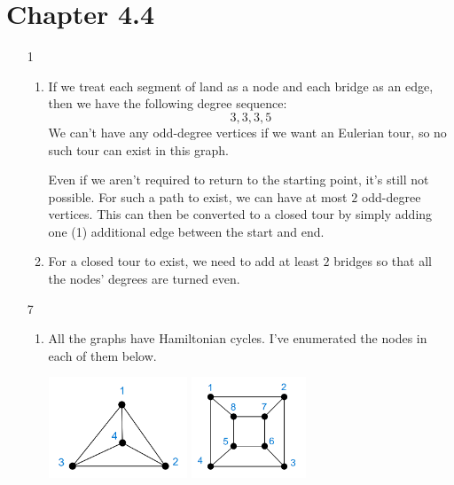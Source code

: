 \documentclass[12pt]{article}
\begin{document}
\section{Chapter 4.4}

\begin{enumerate}
      \item[1] \begin{enumerate}
                  \item If we treat each segment of land as a node and each bridge as an edge,
                        then we have the following degree sequence:
                        \[3, 3, 3, 5\]
                        We can't have any odd-degree vertices if we want an Eulerian tour,
                        so no such tour can exist in this graph.

                        Even if we aren't required to return to the starting point,
                        it's still not possible.
                        For such a path to exist, we can have at most $2$ odd-degree vertices.
                        This can then be converted to a closed tour by simply adding
                        one (1) additional edge between the start and end.
                  \item For a closed tour to exist, we need to add at least $2$ bridges
                        so that all the nodes' degrees are turned even.
            \end{enumerate}
      \item[7] \begin{enumerate}
                  \item All the graphs have Hamiltonian cycles.
                        I've enumerated the nodes in each of them below.
                        \begin{center}
                              \hfill
                              \includegraphics[height=3cm]{img/hw2/hamil1}
                              \hfill
                              \includegraphics[height=3cm]{img/hw2/hamil2}

\end{center}
\end{enumerate}
\end{enumerate}
\end{document}
